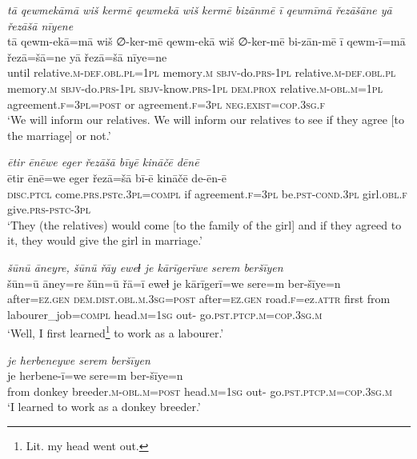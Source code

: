 \ea \label{ŽE.83}
\textit{tā qewmekāmā wiš kermē qewmekā wiš kermē bizānmē ī qewmīmā řezāšāne yā řezāšā nīyene} \\ 
\gll tā qewm-ekā=mā wiš ∅-ker-mē qewm-ekā wiš ∅-ker-mē bi-zān-mē ī qewm-ī=mā řezā=šā=ne yā řezā=šā nīye=ne \\ 
 until relative\textsc{.m}\textsc{-def}\textsc{.obl}\textsc{.pl}\textsc{=1pl} memory\textsc{.m} \textsc{sbjv-}do\textsc{.prs}\textsc{-1pl} relative\textsc{.m}\textsc{-def}\textsc{.obl}\textsc{.pl} memory\textsc{.m} \textsc{sbjv-}do\textsc{.prs}\textsc{-1pl} \textsc{sbjv-}know\textsc{.prs}\textsc{-1pl} \textsc{dem.prox} relative\textsc{.m}\textsc{-obl}\textsc{.m}\textsc{=1pl} agreement\textsc{.f}\textsc{=3pl}\textsc{=\textsc{post}} or agreement\textsc{.f}\textsc{=3pl} \textsc{\textsc{neg.}exist}\textsc{=cop}\textsc{.3sg}\textsc{.f} \\ 
\glt `We will inform our relatives. We will inform our relatives to see if they agree [to the  marriage] or not.'
\z 
 
\ea \label{ŽE.84}
\textit{ētir ēnēwe eger řezāšā bīyē kināčē dēnē} \\ 
\gll ētir ēnē=we eger řezā=šā bī-ē kināčē de-ēn-ē \\ 
 \textsc{disc}.\textsc{ptcl} come\textsc{.prs}\textsc{.pst}c\textsc{.3pl}\textsc{=compl} if agreement\textsc{.f}\textsc{=3pl} be\textsc{.pst}\textsc{-cond}\textsc{.3pl} girl\textsc{.obl}\textsc{.f} give\textsc{.prs}\textsc{-pstc-3pl} \\ 
\glt `They (the relatives) would come [to the family of the girl] and if they agreed to it, they would give the girl in marriage.'
\z 
 
\ea \label{ŽM.4}
\textit{šūnū āneyre, šūnū řāy eweɫ je kārīgerīwe serem beršīyen} \\ 
\gll šūn=ū āney=re šūn=ū řā=ī eweɫ je kārīgerī=we sere=m ber-šīye=n \\ 
 after\textsc{=ez.gen} \textsc{dem.dist}\textsc{.obl}\textsc{.m}\textsc{.3sg}\textsc{=\textsc{post}} after\textsc{=ez.gen} road\textsc{.f}=ez.\textsc{attr} first from labourer\_job\textsc{=compl} head\textsc{.m}\textsc{=\textsc{1sg}} out- go\textsc{.pst}\textsc{.ptcp}\textsc{.m}\textsc{=cop}\textsc{.3sg}\textsc{.m} \\ 
\glt `Well, I first learned\footnote{Lit. my head went out.}  to work as a labourer.'
\z 
 
\ea \label{ŽM.5}
\textit{je herbeneywe serem beršīyen} \\ 
\gll je herbene-ī=we sere=m ber-šīye=n \\ 
 from donkey breeder\textsc{.m}\textsc{-obl}\textsc{.m}\textsc{=\textsc{post}} head\textsc{.m}\textsc{=\textsc{1sg}} out- go\textsc{.pst}\textsc{.ptcp}\textsc{.m}\textsc{=cop}\textsc{.3sg}\textsc{.m} \\ 
\glt `I learned to work as a donkey breeder.'
\z 
 
